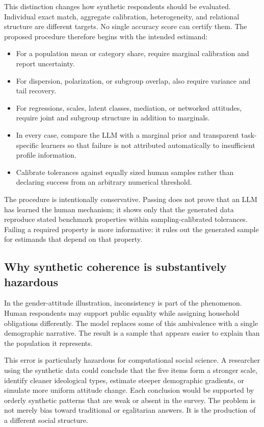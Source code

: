 \documentclass[10pt,twocolumn]{article}
\begin{document}
This distinction changes how synthetic respondents should be evaluated. Individual exact match,
aggregate calibration, heterogeneity, and relational structure are different targets. No single
accuracy score can certify them. The proposed procedure therefore begins with the intended
estimand:

\begin{itemize}[leftmargin=2em]
  \item For a population mean or category share, require marginal calibration and report uncertainty.
  \item For dispersion, polarization, or subgroup overlap, also require variance and tail recovery.
  \item For regressions, scales, latent classes, mediation, or networked attitudes, require joint and
  subgroup structure in addition to marginals.
  \item In every case, compare the LLM with a marginal prior and transparent task-specific learners
  so that failure is not attributed automatically to insufficient profile information.
  \item Calibrate tolerances against equally sized human samples rather than declaring success from
  an arbitrary numerical threshold.
\end{itemize}

The procedure is intentionally conservative. Passing does not prove that an LLM has learned the
human mechanism; it shows only that the generated data reproduce stated benchmark properties within
sampling-calibrated tolerances. Failing a required property is more informative: it rules out the
generated sample for estimands that depend on that property.

\subsection{Why synthetic coherence is substantively hazardous}

In the gender-attitude illustration, inconsistency is part of the phenomenon. Human respondents may
support public equality while assigning household obligations differently. The model replaces some
of this ambivalence with a single demographic narrative. The result is a sample that appears easier
to explain than the population it represents.

This error is particularly hazardous for computational social science. A researcher using the
synthetic data could conclude that the five items form a stronger scale, identify cleaner ideological
types, estimate steeper demographic gradients, or simulate more uniform attitude change. Each
conclusion would be supported by orderly synthetic patterns that are weak or absent in the survey.
The problem is not merely bias toward traditional or egalitarian answers. It is the production of a
different social structure.
\end{document}

